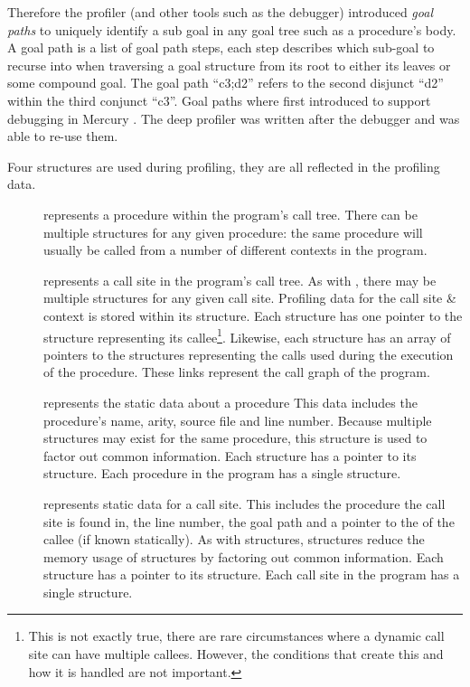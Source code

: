 Therefore the profiler
(and other tools such as the debugger) introduced \emph{goal paths}
to uniquely identify a sub goal in any goal tree such as a procedure's
body.
A goal path is a list of goal path steps, each step describes which
sub-goal to recurse into when traversing a goal structure from its root
to either its leaves or some compound goal.
The goal path ``c3;d2'' refers to the second disjunct ``d2'' within the
third conjunct ``c3''.
Goal paths where first introduced to support debugging in Mercury \citep{mdb}.
The deep profiler was written after the debugger and was able to re-use them.

Four structures are used during profiling,
they are all reflected in the profiling data.

\begin{description}

    \item[\PD]
    represents a procedure within the program's call tree.
    There can be multiple \PD structures for any given procedure:
    the same procedure will usually be called from a number of different
    contexts in the program.

    \item[\CSD]
    represents a call site in the program's call tree.
    As with \PD, there may be multiple \CSD structures for any given
    call site.
    Profiling data for the call site \& context is stored within its \CSD
    structure.
    Each \CSD structure has one pointer to the \PD structure representing
    its callee\footnote{
        This is not exactly true,
        there are rare circumstances where a dynamic call site can have
        multiple callees.
        However, the conditions that create this and how it is handled
        are not important.}.
    Likewise, each \PD structure has an array of pointers to the \CSD
    structures representing the calls used during the execution of the
    procedure.
    These links represent the call graph of the program.

    \item[\PS]
    represents the static data about a procedure
    This data includes the procedure's name, arity, source file and line
    number.
    Because multiple \PD structures may exist for the same procedure,
    this structure is used to factor out common information.
    Each \PD structure has a pointer to its \PS structure.
    Each procedure in the program has a single \PS structure.

    \item[\CSS]
    represents static data for a call site.
    This includes the procedure the call site is found in, the line number,
    the goal path and a pointer to the \PS of the callee (if known
    statically).
    As with \PS structures,
    \CSS structures reduce the memory usage of \CSD structures by
    factoring out common information.
    Each \CSD structure has a pointer to its \CSS structure.
    Each call site in the program has a single \CSS structure.

\end{description}

